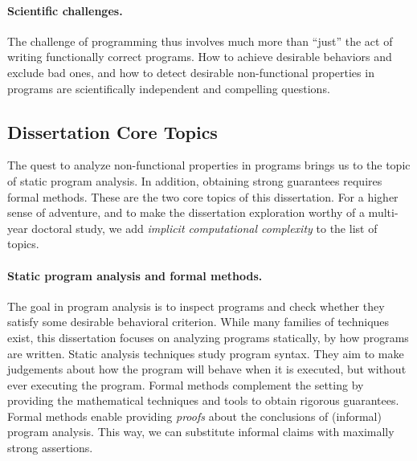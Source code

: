 \paragraph{Scientific challenges.}
The challenge of programming thus involves much more than \enquote{just} the act
of writing functionally correct programs. How to achieve desirable behaviors and
exclude bad ones, and how to detect desirable non-functional properties in
programs are scientifically independent and compelling questions.

\subsection{Dissertation Core Topics}
\label{subsec:dissertation-themes}

The quest to analyze non-functional properties in programs brings us to the
topic of static program analysis. In addition, obtaining strong guarantees
requires formal methods. These are the two core topics of this
dissertation. For a higher sense of adventure, and to make the dissertation
exploration worthy of a multi-year doctoral study, we add \emph{implicit
computational complexity} to the list of topics.

\paragraph{Static program analysis and formal methods.}
The goal in program analysis is to inspect programs and check whether they
satisfy some desirable behavioral criterion. While many families of techniques
exist, this dissertation focuses on analyzing programs statically, \ie by how
programs are written. Static analysis techniques study program syntax. They aim
to make judgements about how the program will behave when it is executed, but
without ever executing the program. Formal methods complement the setting by
providing the mathematical techniques and tools to obtain rigorous guarantees.
Formal methods enable providing \emph{proofs} about the conclusions of
(informal) program analysis. This way, we can substitute informal claims with
maximally strong assertions.

